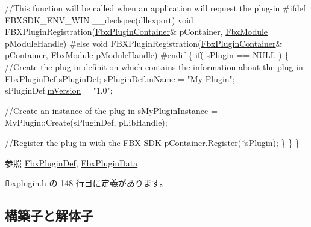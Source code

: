 \begin{DoxyCode}
    \textcolor{comment}{//This function will be called when an application will request the plug-in}
\textcolor{preprocessor}{#ifdef FBXSDK\_ENV\_WIN}
    \_\_declspec(dllexport) \textcolor{keywordtype}{void} FBXPluginRegistration(\hyperlink{class_fbx_plugin_container}{FbxPluginContainer}& pContainer, 
      \hyperlink{fbxmodule_8h_a1d2ed3e9ccb8075d585f7cb7bdf40420}{FbxModule} pModuleHandle)
\textcolor{preprocessor}{#else}
    \textcolor{keywordtype}{void} FBXPluginRegistration(\hyperlink{class_fbx_plugin_container}{FbxPluginContainer}& pContainer, 
      \hyperlink{fbxmodule_8h_a1d2ed3e9ccb8075d585f7cb7bdf40420}{FbxModule} pModuleHandle)
\textcolor{preprocessor}{#endif}
    \{
        \textcolor{keywordflow}{if}( sPlugin == \hyperlink{fbxarch_8h_a070d2ce7b6bb7e5c05602aa8c308d0c4}{NULL} )
        \{
            \textcolor{comment}{//Create the plug-in definition which contains the information about the plug-in}
            \hyperlink{struct_fbx_plugin_def}{FbxPluginDef} sPluginDef;
            sPluginDef.\hyperlink{struct_fbx_plugin_def_ac98378284bf666cbba614e9121ba7189}{mName} = \textcolor{stringliteral}{"My Plugin"};
            sPluginDef.\hyperlink{struct_fbx_plugin_def_aeea048adb24ec74cb906df076bedf21d}{mVersion} = \textcolor{stringliteral}{"1.0"};

            \textcolor{comment}{//Create an instance of the plug-in}
            sMyPluginInstance = MyPlugin::Create(sPluginDef, pLibHandle);

            \textcolor{comment}{//Register the plug-in with the FBX SDK}
            pContainer.\hyperlink{class_fbx_plugin_container_a3fc28ffe0296973afb3014112b4b0df0}{Register}(*sPlugin);
        \}
    \}
\}
\end{DoxyCode}
 \begin{DoxySeeAlso}{参照}
\hyperlink{struct_fbx_plugin_def}{Fbx\+Plugin\+Def}, \hyperlink{struct_fbx_plugin_data}{Fbx\+Plugin\+Data} 
\end{DoxySeeAlso}


 fbxplugin.\+h の 148 行目に定義があります。



\subsection{構築子と解体子}
\mbox{\label{class_fbx_plugin_ab9ee11bcfcbc81e8fa9696f113e03181}} 
